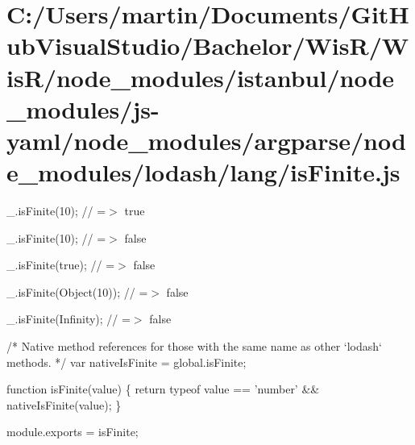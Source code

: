 \hypertarget{_c_1_2_users_2martin_2_documents_2_git_hub_visual_studio_2_bachelor_2_wis_r_2_wis_r_2node_module60dd093a380e591d3d57a7c84c3c4b76}{}\section{C\+:/\+Users/martin/\+Documents/\+Git\+Hub\+Visual\+Studio/\+Bachelor/\+Wis\+R/\+Wis\+R/node\+\_\+modules/istanbul/node\+\_\+modules/js-\/yaml/node\+\_\+modules/argparse/node\+\_\+modules/lodash/lang/is\+Finite.\+js}
\+\_\+.\+is\+Finite(10); // =$>$ true

\+\_\+.\+is\+Finite(\textquotesingle{}10\textquotesingle{}); // =$>$ false

\+\_\+.\+is\+Finite(true); // =$>$ false

\+\_\+.\+is\+Finite(\+Object(10)); // =$>$ false

\+\_\+.\+is\+Finite(\+Infinity); // =$>$ false


\begin{DoxyCodeInclude}
\textcolor{comment}{/* Native method references for those with the same name as other `lodash` methods. */}
var nativeIsFinite = global.isFinite;

\textcolor{keyword}{function} isFinite(value) \{
  \textcolor{keywordflow}{return} typeof value == \textcolor{stringliteral}{'number'} && nativeIsFinite(value);
\}

module.exports = isFinite;
\end{DoxyCodeInclude}
 